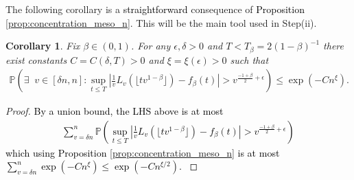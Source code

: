 \documentclass[letterpaper,11pt,reqno]{amsart}
\newtheorem{cor}[thm]{Corollary}
\theoremstyle{definition}
\renewcommand{\leq}{\leqslant}
\newcommand{\prob}{\mathbb{P}}
\begin{document}
The following corollary is a \textcolor{black}{straightforward} consequence of \textcolor{black}{Proposition} \ref{prop:concentration_meso_n}. This will be the main tool used in Step(ii).
\begin{cor}
    \label{cor:concentration_meso}
    Fix $\beta \in (0,1)$. For any $\epsilon,\delta>0$ and $T < T_\beta = 2(1-\beta)^{-1}$ there exist constants $C=C(\delta,T)>0$ and $\xi=\xi(\epsilon)>0$ such that
    \begin{align*}
        \prob\left(\exists\;\;v \in [\delta n, n]: \sup_{t\leq T }\left|\frac{1}{v}L_v(\lfloor tv^{1-\beta} \rfloor)-f_{\beta}(t)\right|>v^{\frac{-1+\beta}{2}+\epsilon}\right)\leq \exp(-Cn^{\xi}).
    \end{align*}
\end{cor}
\begin{proof}
\textcolor{black}{
    By a union bound, the LHS above is at most
    \begin{align*}
        \sum_{v = \delta n}^n\prob \left(\sup_{t\leq T }\left|\frac{1}{v}L_v(\lfloor tv^{1-\beta} \rfloor)-f_{\beta}(t)\right|>v^{\frac{-1+\beta}{2}+\epsilon} \right)
    \end{align*}
    which using Proposition \ref{prop:concentration_meso_n} is at most $\sum_{v=\delta n}^n\exp \left(-Cn^{\xi} \right)\leq \exp\left(-Cn^{\xi/2} \right)$.
    }
\end{proof}
\end{document}
